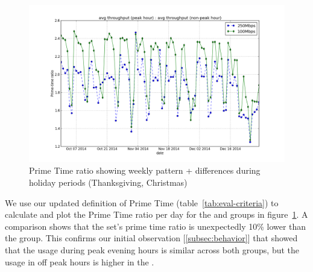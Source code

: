 \begin{figure}[ht]
\begin{minipage}{\linewidth}
\centering
\includegraphics[width=\linewidth]{figures/prime-time-ratio-by-date[replace].png}
\caption{Prime Time ratio showing weekly pattern + differences during holiday periods (Thanksgiving, Christmas)}
\label{fig:TS-prime-time-ratio}
\end{minipage}
\end{figure}

We use our updated definition of Prime Time (table~\ref{tab:eval-criteria}) to calculate and plot
the Prime Time ratio per day for the \treatment{} and \control{} groups in
figure~\ref{fig:TS-prime-time-ratio}. A comparison shows that
the \treatment{} set's prime time ratio is unexpectedly 10\% lower than the 
\control{} group. 
This confirms our initial observation [\autoref{subsec:behavior}] that showed 
that the usage during peak evening hours is similar
across both groups, but the usage in off peak hours is higher in the \treatment{}.